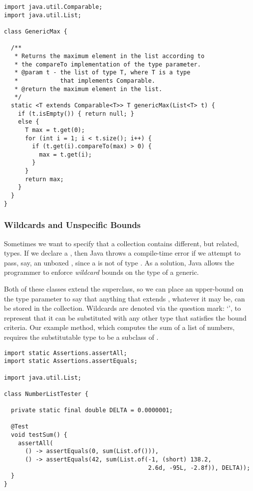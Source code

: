 \begin{lstlisting}[language=MyJava]
import java.util.Comparable;
import java.util.List;

class GenericMax {
  
  /**
   * Returns the maximum element in the list according to 
   * the compareTo implementation of the type parameter.
   * @param t - the list of type T, where T is a type 
   *            that implements Comparable.
   * @return the maximum element in the list.
   */
  static <T extends Comparable<T>> T genericMax(List<T> t) {
    if (t.isEmpty()) { return null; }
    else {
      T max = t.get(0);
      for (int i = 1; i < t.size(); i++) {
        if (t.get(i).compareTo(max) > 0) { 
          max = t.get(i); 
        }
      }
      return max;
    }
  }
}
\end{lstlisting}

\subsubsection*{Wildcards and Unspecific Bounds}
Sometimes we want to specify that a collection contains different, but related, types. 
If we declare a , then Java throws a compile-time error if we attempt to pass, say, an unboxed , since a  is not of type . 
As a solution, Java allows the programmer to enforce \emph{wildcard} bounds on the type of a generic. 

Both of these classes extend the  superclass, so we can place an upper-bound on the type parameter to say that anything that extends , whatever it may be, can be stored in the collection. 
Wildcards are denoted via the question mark: `', to represent that it can be substituted with any other type that satisfies the bound criteria. 
Our example method, which computes the sum of a list of numbers, requires the substitutable type to be a subclass of .

\begin{lstlisting}[language=MyJava]
import static Assertions.assertAll;
import static Assertions.assertEquals;

import java.util.List;

class NumberListTester {

  private static final double DELTA = 0.0000001;

  @Test
  void testSum() {
    assertAll(
      () -> assertEquals(0, sum(List.of())),
      () -> assertEquals(42, sum(List.of(-1, (short) 138.2, 
                                         2.6d, -95L, -2.8f)), DELTA));
  }
}
\end{lstlisting}

